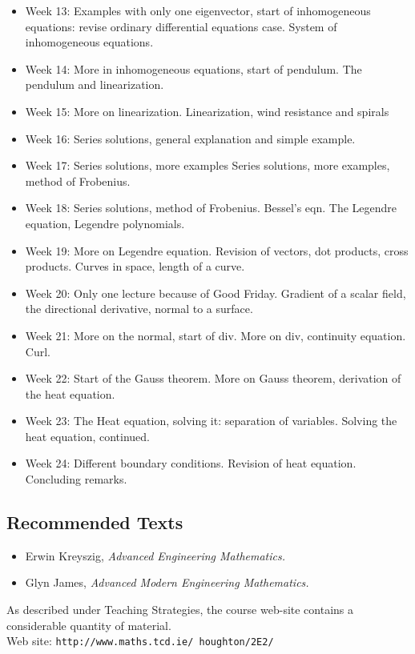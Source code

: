 \documentclass[12pt,a4wide]{article}
\begin{document}
\begin{itemize}
\item Week 13: Examples with only one eigenvector, start of inhomogeneous equations: revise ordinary differential equations case. System of inhomogeneous equations.
\item Week 14: More in inhomogeneous equations, start of pendulum. The pendulum and linearization.
\item Week 15: More on linearization. Linearization, wind resistance and spirals 
\item Week 16: Series solutions, general explanation and simple example.
\item Week 17: Series solutions, more examples Series solutions, more examples, method of Frobenius.
\item Week 18: Series solutions, method of Frobenius. Bessel's eqn. The Legendre equation, Legendre polynomials.
\item Week 19: More on Legendre equation. Revision of vectors, dot products, cross products. Curves in space, length of a curve.
\item Week 20: Only one lecture because of Good Friday. Gradient of a scalar field, the directional derivative, normal to a surface.
\item Week 21: More on the normal, start of div. More on div, continuity equation. Curl.
\item Week 22: Start of the Gauss theorem. More on Gauss theorem, derivation of the heat equation.
\item Week 23: The Heat equation, solving it: separation of variables. Solving the heat equation, continued.
\item Week 24: Different boundary conditions. Revision of heat equation. Concluding remarks.
\end{itemize}


\subsection*{Recommended Texts}
\begin{itemize}
\item Erwin Kreyszig, {\sl Advanced Engineering Mathematics.} 
\item Glyn James, {\sl Advanced Modern Engineering Mathematics.}
\end{itemize}
As described under Teaching Strategies, the course web-site contains a considerable quantity of material.\\
Web site: {\tt http://www.maths.tcd.ie/~houghton/2E2/}
\end{document}
